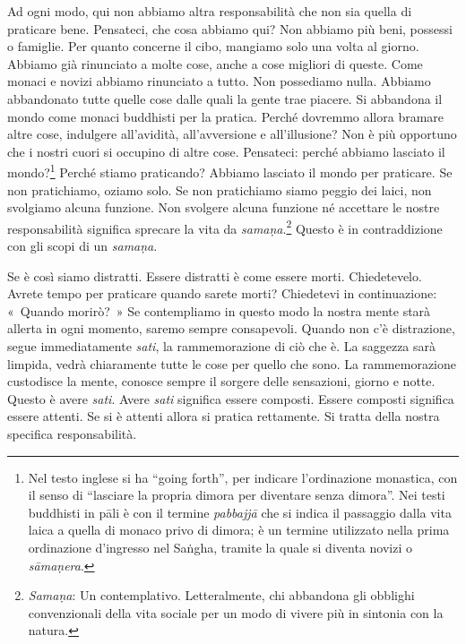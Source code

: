 Ad ogni modo, qui non abbiamo altra responsabilità che non sia quella di
praticare bene. Pensateci, che cosa abbiamo qui? Non abbiamo più beni,
possessi o famiglie. Per quanto concerne il cibo, mangiamo solo una
volta al giorno. Abbiamo già rinunciato a molte cose, anche a cose
migliori di queste. Come monaci e novizi abbiamo rinunciato a tutto. Non
possediamo nulla. Abbiamo abbandonato tutte quelle cose dalle quali la
gente trae piacere. Si abbandona il mondo come monaci buddhisti per la
pratica. Perché dovremmo allora bramare altre cose, indulgere
all'avidità, all'avversione e all'illusione? Non è più opportuno che i
nostri cuori si occupino di altre cose. Pensateci: perché abbiamo
lasciato il mondo?\footnote{%
  Nel testo inglese si ha ``going forth'', per indicare l'ordinazione
  monastica, con il senso di ``lasciare la propria dimora per diventare
  senza dimora''. Nei testi buddhisti in pāli è con il termine
  \emph{pabbajjā} che si indica il passaggio dalla vita laica a quella di
  monaco privo di dimora; è un termine utilizzato nella prima
  ordinazione d'ingresso nel Saṅgha, tramite la quale si diventa novizi
  o \emph{sāmaṇera}.}
Perché stiamo praticando? Abbiamo lasciato il mondo per
praticare. Se non pratichiamo, oziamo solo. Se non pratichiamo siamo
peggio dei laici, non svolgiamo alcuna funzione. Non svolgere alcuna
funzione né accettare le nostre responsabilità significa sprecare la
vita da \emph{samaṇa}.\footnote{\emph{Samaṇa}: Un contemplativo.
  Letteralmente, chi abbandona gli obblighi convenzionali della vita
  sociale per un modo di vivere più in sintonia con la natura.} Questo è
in contraddizione con gli scopi di un \emph{samaṇa}.

Se è così siamo distratti. Essere distratti è come essere morti.
Chiedetevelo. Avrete tempo per praticare quando sarete morti? Chiedetevi
in continuazione: «~Quando morirò?~» Se contempliamo in questo modo la
nostra mente starà allerta in ogni momento, saremo sempre consapevoli.
Quando non c'è distrazione, segue immediatamente \emph{sati}, la
rammemorazione di ciò che è. La saggezza sarà limpida, vedrà chiaramente
tutte le cose per quello che sono. La rammemorazione custodisce la
mente, conosce sempre il sorgere delle sensazioni, giorno e notte.
Questo è avere \emph{sati}. Avere \emph{sati} significa essere composti.
Essere composti significa essere attenti. Se si è attenti allora si
pratica rettamente. Si tratta della nostra specifica responsabilità.

